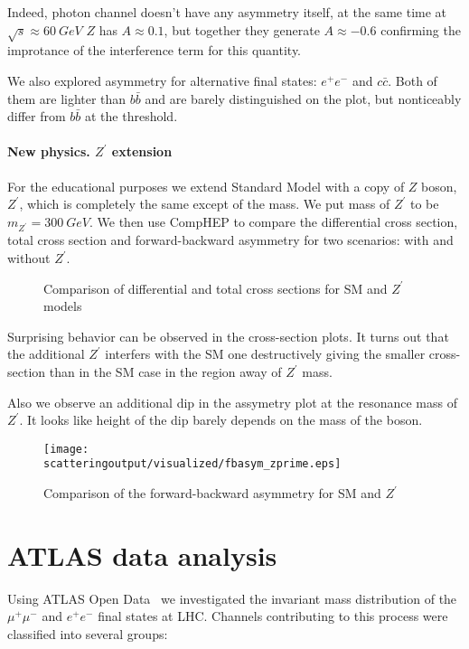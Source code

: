 \documentclass{article}
\newcommand{\scatteringoutput}{../scattering/output}
\begin{document}
Indeed, photon channel doesn't have any asymmetry itself, at the same time at $\sqrt{s} \approx 60~GeV$ $Z$ has $A \approx 0.1$, but together they generate $A \approx -0.6$ confirming the improtance of the interference term for this quantity.

We also explored asymmetry for alternative final states: $e^{+} e^{-}$ and $c \bar{c}$. Both of them are lighter than $b \bar{b}$ and are barely distinguished on the plot, but nonticeably differ from $b \bar{b}$ at the threshold.

\paragraph{New physics. $Z^\prime$ extension} For the educational purposes we extend Standard Model with a copy of $Z$ boson, $Z^\prime$, which is completely the same except of the mass. We put mass of $Z^\prime$ to be $m_{Z^\prime} = 300~GeV$. We then use CompHEP to compare the differential cross section, total cross section and forward-backward asymmetry for two scenarios: with and without $Z^\prime$.

\begin{figure}[H]
    \centering
    \hfill%
    \caption{Comparison of differential and total cross sections for SM and $Z^\prime$ models}%
    \label{fig:crsc_zprime}
\end{figure}

Surprising behavior can be observed in the cross-section plots. It turns out that the additional $Z^\prime$ interfers with the SM one destructively giving the smaller cross-section than in the SM case in the region away of $Z^\prime$ mass.

Also we observe an additional dip in the assymetry plot at the resonance mass of $Z^\prime$. It looks like height of the dip barely depends on the mass of the boson.

\begin{figure}[H]
    \centering
    \texttt{[image: \\scatteringoutput/visualized/fbasym\_zprime.eps]}
    \caption{Comparison of the forward-backward asymmetry for SM and $Z^\prime$}%
    \label{fig:fbasym_zprime}
\end{figure}

\section{ATLAS data analysis}
Using ATLAS Open Data~\cite{url:atlas-open-data} we investigated the invariant mass distribution of the $\mu^{+} \mu^{-}$ and $e^{+} e^{-}$ final states at LHC\@. Channels contributing to this process were classified into several groups:
\end{document}
